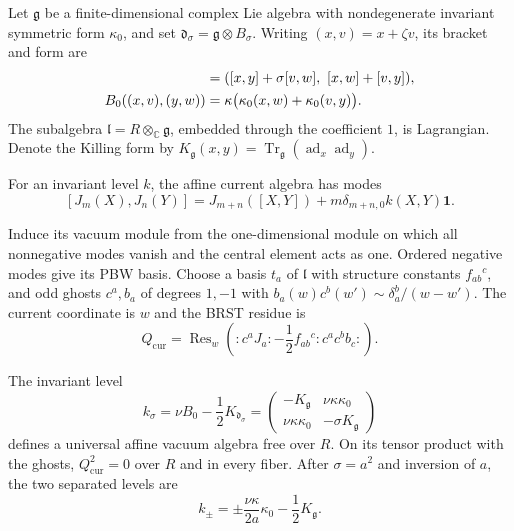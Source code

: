Let
$\mathfrak g$ be a finite-dimensional complex Lie algebra with
nondegenerate invariant symmetric form $\kappa_0$, and set
$\mathfrak d_\sigma=\mathfrak g\otimes B_\sigma$.
Writing $(x,v)=x+\zeta v$, its bracket and form are
\begin{align}
 [(x,v),(y,w)]&=([x,y]+\sigma[v,w],\ [x,w]+[v,y]),\notag\\
 B_0((x,v),(y,w))&=\kappa\bigl(\kappa_0(x,w)+\kappa_0(v,y)\bigr).
 \label{mht:eq:collision-current-form}
\end{align}
The subalgebra $\mathfrak l=R\otimes_{\mathbb C}\mathfrak g$,
embedded through the coefficient $1$, is Lagrangian.
Denote the Killing form by
$K_{\mathfrak g}(x,y)=\operatorname{Tr}_{\mathfrak g}
(\operatorname{ad}_x\operatorname{ad}_y)$.

For an invariant level $k$, the affine current algebra has modes
\[
 [J_m(X),J_n(Y)]=J_{m+n}([X,Y])
               +m\delta_{m+n,0}k(X,Y)\mathbf1.
\]

Induce its vacuum module from the one-dimensional module on which
all nonnegative modes vanish and the central element acts as one.
Ordered negative modes give its PBW basis.
Choose a basis $t_a$ of $\mathfrak l$ with structure constants
$f_{ab}{}^c$, and odd ghosts $c^a,b_a$ of degrees $1,-1$ with
$b_a(w)c^b(w')\sim\delta_a^b/(w-w')$.
The current coordinate is $w$ and the BRST residue is
\begin{equation}\label{mht:eq:affine-brst-residue}
 Q_{\mathrm{cur}}=\operatorname{Res}_w
       \left({:}c^aJ_a{:}
          -\frac12 f_{ab}{}^c{:}c^ac^bb_c{:}\right).
\end{equation}

\begin{proposition}\label{mht:prop:collision-current-level}
The invariant level
\begin{equation}\label{mht:eq:collision-current-level}
 k_\sigma=\nu B_0-\frac12K_{\mathfrak d_\sigma}
    =\begin{pmatrix}-K_{\mathfrak g}&\nu\kappa\kappa_0\\
                    \nu\kappa\kappa_0&-\sigma K_{\mathfrak g}
      \end{pmatrix}
\end{equation}
defines a universal affine vacuum algebra free over $R$.
On its tensor product with the ghosts,
$Q_{\mathrm{cur}}^2=0$ over $R$ and in every fiber.
After $\sigma=a^2$ and inversion of $a$, the two separated levels are
\[
 k_\pm=\pm\frac{\nu\kappa}{2a}\kappa_0
                         -\frac12K_{\mathfrak g}.
\]
\end{proposition}

